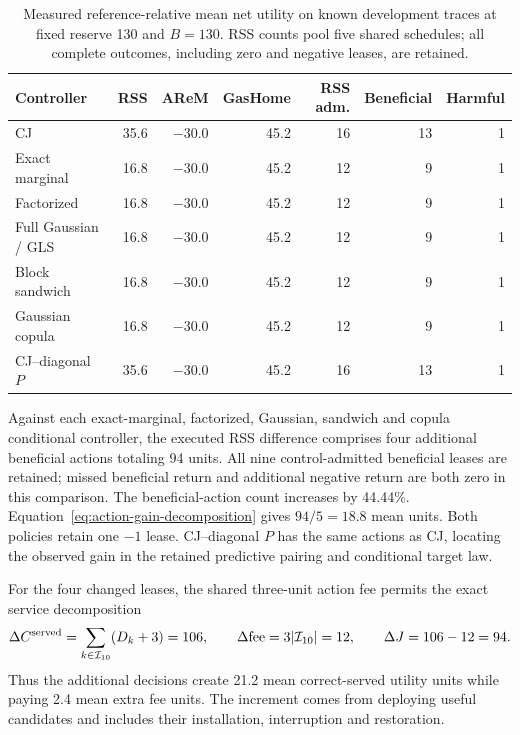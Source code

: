 \documentclass[10pt]{article}
\begin{document}
\begin{table}[t]
\centering\small
\caption{Measured reference-relative mean net utility on known development
traces at fixed reserve 130 and $B=130$. RSS counts pool five shared
schedules; all complete outcomes, including zero and negative leases,
are retained.}
\label{tab:conditional-development}
\begin{tabular}{lrrrrrr}
\toprule
Controller & RSS & AReM & GasHome & RSS adm. & Beneficial & Harmful\\
\midrule
CJ & 35.6 & $-30.0$ & 45.2 & 16 & 13 & 1\\
Exact marginal & 16.8 & $-30.0$ & 45.2 & 12 & 9 & 1\\
Factorized & 16.8 & $-30.0$ & 45.2 & 12 & 9 & 1\\
Full Gaussian / GLS & 16.8 & $-30.0$ & 45.2 & 12 & 9 & 1\\
Block sandwich & 16.8 & $-30.0$ & 45.2 & 12 & 9 & 1\\
Gaussian copula & 16.8 & $-30.0$ & 45.2 & 12 & 9 & 1\\
CJ--diagonal $P$ & 35.6 & $-30.0$ & 45.2 & 16 & 13 & 1\\
\bottomrule
\end{tabular}
\end{table}

Against each exact-marginal, factorized, Gaussian, sandwich and copula
conditional controller, the executed RSS difference comprises four
additional beneficial actions totaling 94 units. All nine control-admitted
beneficial leases are retained; missed beneficial return and additional
negative return are both zero in this comparison. The beneficial-action
count increases by 44.44\%. Equation~\eqref{eq:action-gain-decomposition}
gives $94/5=18.8$ mean units. Both policies retain one $-1$ lease.
CJ--diagonal $P$ has the same actions as CJ, locating the observed gain
in the retained predictive pairing and conditional target law.

For the four changed leases, the shared three-unit action fee permits
the exact service decomposition
\begin{equation}
 \Delta C^{\rm served}=\sum_{k\in\mathcal I_{10}}(D_k+3)=106,
 \qquad \Delta\mathrm{fee}=3|\mathcal I_{10}|=12,
 \qquad \Delta J=106-12=94.
 \label{eq:rss-useful-service-gain}
\end{equation}
Thus the additional decisions create 21.2 mean correct-served utility units
while paying 2.4 mean extra fee units. The increment comes from deploying
useful candidates and includes their installation, interruption and restoration.
\end{document}
